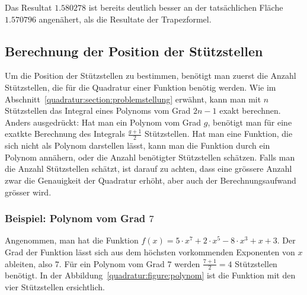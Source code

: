 \noindent
Das Resultat $1.580278$ ist bereits deutlich besser an der tatsächlichen Fläche $1.570796$ 
angenähert, als die Resultate der Trapezformel. 

\subsection{Berechnung der Position der Stützstellen
\label{quadratur:subsection:stützstellenberechnung}}
Um die Position der Stützstellen zu bestimmen, benötigt man zuerst die Anzahl Stützstellen, 
die für die Quadratur einer Funktion benötig werden.
\noindent
Wie im Abschnitt~\ref{quadratur:section:problemstellung} erwähnt, 
kann man mit $n$ Stützstellen das Integral eines Polynoms vom Grad $2n-1$ exakt berechnen.
Anders ausgedrückt: Hat man ein Polynom vom Grad $g$, 
benötigt man für eine exatkte Berechnung des Integrals $\frac{g+1}{2}$ Stützstellen.
Hat man eine Funktion, die sich nicht als Polynom darstellen lässt, 
kann man die Funktion durch ein Polynom annähern, 
oder die Anzahl benötigter Stützstellen schätzen.
Falls man die Anzahl Stützstellen schätzt, ist darauf zu achten, 
dass eine grössere Anzahl zwar die Genauigkeit der Quadratur erhöht,
aber auch der Berechnungsaufwand grösser wird.


\subsubsection{Beispiel: Polynom vom Grad $7$}
Angenommen, man hat die Funktion $f(x) = 5 \cdot x^{7} + 2 \cdot x^{5} - 8 \cdot x^{3} + x + 3$.
Der Grad der Funktion lässt sich aus dem höchsten vorkommenden Exponenten von $x$ ableiten,
also $7$.
Für ein Polynom vom Grad $7$ werden $\frac{7+1}{2} = 4$ Stützstellen benötigt.
In der Abbildung~\ref{quadratur:figure:polynom} ist die Funktion mit den vier 
Stützstellen ersichtlich.

